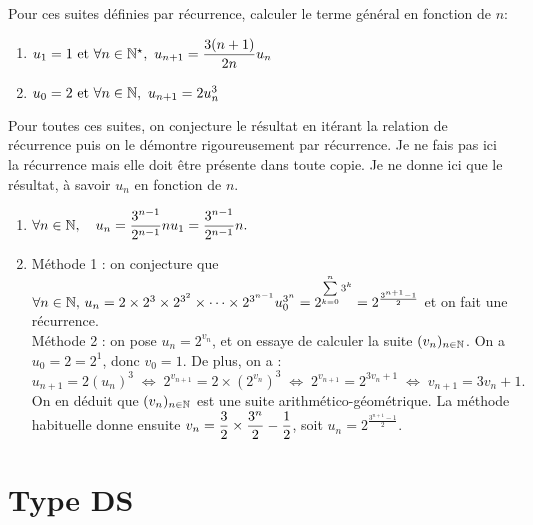 \documentclass[a4paper, 11pt]{article}
\begin{document}
\vspace{0.4cm}
\begin{exercice} \;
Pour ces suites d\'efinies par r\'ecurrence, calculer le terme g\'en\'eral en fonction de $n$:
\begin{enumerate}
\item 
$u_1=1\ \hbox{et}\ \forall n\in\mathbb{N}^{\star},\ u_{n+1}=\displaystyle\frac{3(n+1)}{2n}u_n$
\item 
$u_0=2\ \hbox{et}\ \forall n\in\N,\ u_{n+1}=2u_n^3$
\end{enumerate}
\end{exercice}

\begin{correction} \;
Pour toutes ces suites, on conjecture le r\'esultat en it\'erant la relation de r\'ecurrence puis on le d\'emontre rigoureusement par r\'ecurrence. Je ne fais pas ici la r\'ecurrence mais elle doit \^etre pr\'esente dans toute copie. Je ne donne ici que le r\'esultat, \`a savoir $u_n$ en fonction de $n$.
\begin{enumerate}
\item $\forall n\in\mathbb{N},\quad u_n=\displaystyle\frac{3^{n-1}}{2^{n-1}}nu_1=\displaystyle\frac{3^{n-1} }{2^{n-1}}n.$
\item M\'ethode 1 : on conjecture que $\forall n\in\mathbb{N},\,u_n=2\times 2^3\times 2^{3^2}\times\dots\times 2^{3^{n-1}} u_0^{3^n}=2^{\sum\limits_{k=0}^{n} 3^k } = 2^{\frac{3^{n+1}-1}{2}}$ et on fait une r\'ecurrence.\\
M\'ethode 2 : on pose $u_n = 2^{v_n}$, et on essaye de calculer la suite $(v_n)_{n\in \mathbb{N}}$. On a $u_0=2=2^1$, donc $v_0=1$. De plus, on a :
$$u_{n+1} =2(u_n)^3 \; \Leftrightarrow \;  2^{v_{n+1}} =  2\times (2^{v_n})^3 \; \Leftrightarrow \; 2^{v_{n+1}} =  2^{3v_n+1} \; \Leftrightarrow \; v_{n+1} = 3v_{n}+1.$$
On en d\'eduit que $(v_n)_{n\in \mathbb{N}}$ est une suite arithm\'etico-g\'eom\'etrique. La m\'ethode habituelle donne ensuite $v_n=\displaystyle\frac{3}{2}\times\frac{3^{n}}{2}-\frac{1}{2}$, soit $u_n= 2^{\frac{3^{n+1}-1}{2}}$.
\end{enumerate}
\end{correction}



\section*{Type DS}
\end{document}
